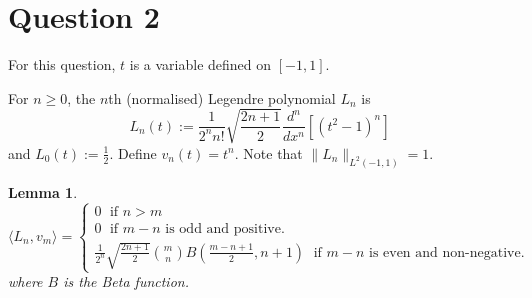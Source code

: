 \documentclass[10pt]{article}
\newtheorem{lemma}[theorem]{Lemma}
\newenvironment{definition}[1][Definition]{\begin{trivlist}
\item[\hskip \labelsep {\bfseries #1}]}{\end{trivlist}}
\begin{document}
    \section*{Question 2}
    For this question, $t$ is a variable defined on $[-1,1]$.
        \begin{definition}
            For $n\geq 0$, the $n$th (normalised) Legendre polynomial $L_n$ is
            \begin{equation*}
                L_n(t) := \frac{1}{2^n n!}\sqrt{\frac{2n+1}{2}}\frac{d^n}{dx^n}[(t^2-1)^n]
            \end{equation*}
            and $L_0(t) := \frac{1}{2}$.
            Define $v_n(t) = t^n$. Note that $\|L_n\|_{L^2(-1,1)} = 1$.
        \end{definition}
        
        \begin{lemma}
            \label{innerProduct}
            \begin{equation*}
                \langle L_n,v_m\rangle  = \begin{cases}
                    0\;\text{ if }n>m\\
                    0\;\text{ if }m-n\text{ is odd and positive.}\\
                    \frac{1}{2^n} \sqrt{\frac{2n+1}{2}}{m\choose n}B(\frac{m-n+1}{2},n+1)\;\text{ if }m-n\text{ is even and non-negative.}
                \end{cases}
            \end{equation*}
               where $B$ is the Beta function.
        \end{lemma}
\end{document}
